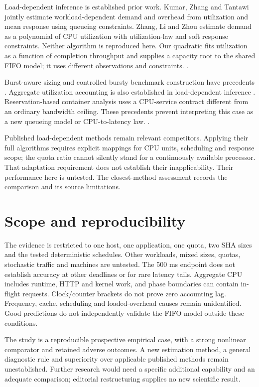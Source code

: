 \documentclass[11pt,a4paper]{article}
\begin{document}
Load-dependent inference is established prior work. Kumar, Zhang and Tantawi
jointly estimate workload-dependent demand and overhead from utilization and
mean response using queueing constraints. Zhang, Li and Zhou estimate demand
as a polynomial of CPU utilization with utilization-law and soft response
constraints. Neither algorithm is reproduced here. Our quadratic fits
utilization as a function of completion throughput and supplies a capacity
root to the shared FIFO model; it uses different observations and constraints.
\cite{kumar,zhang}.

Burst-aware sizing and controlled bursty benchmark construction have
precedents \cite{mi,casale}. Aggregate utilization accounting is also established in
load-dependent inference \cite{kumar,zhang}. Reservation-based container analysis uses a CPU-service
contract different from an ordinary bandwidth ceiling. These precedents
prevent interpreting this case as a new queueing model or CPU-to-latency law.
\cite{mi,casale,cucinotta}.

Published load-dependent methods remain relevant competitors. Applying their
full algorithms requires explicit mappings for CPU units, scheduling and
response scope; the quota ratio cannot silently stand for a continuously
available processor. That adaptation requirement does not establish their
inapplicability. Their performance here is untested. The
closest-method assessment
records the comparison and its source limitations.

\section{Scope and reproducibility}

The evidence is restricted to one host, one application, one quota, two SHA
sizes and the tested deterministic schedules. Other workloads, mixed sizes,
quotas, stochastic traffic and machines are untested. The 500 ms endpoint
does not establish accuracy at other deadlines or for rare latency tails.
Aggregate CPU includes runtime, HTTP and kernel work, and phase boundaries
can contain in-flight requests. Clock/counter brackets do not prove zero
accounting lag. Frequency, cache, scheduling and loaded-overhead causes remain
unidentified. Good predictions do not independently validate the FIFO model
outside these conditions.

The study is a reproducible prospective empirical case, with a strong
nonlinear comparator and retained adverse outcomes. A new estimation method,
a general diagnostic rule and superiority over applicable published methods
remain unestablished. Further research would need a specific additional
capability and an adequate comparison; editorial restructuring supplies no
new scientific result.
\end{document}
